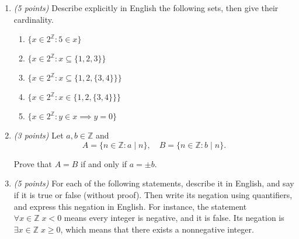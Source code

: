 \documentclass[12pt]{article}
\begin{document}
\begin{enumerate}[itemsep=1.2em]

\item \emph{(5 points)} Describe explicitly in English the following sets, then give their cardinality.

\begin{enumerate}[label=\textbf{\alph*.}, itemsep=1em]
    \item \(\{ x \in 2^{\mathbb{Z}} : 5 \in x \}\) \newline

    \item \(\{ x \in 2^{\mathbb{Z}} : x \subseteq \{ 1, 2, 3 \} \}\)\newline

    \item \(\{ x \in 2^{\mathbb{Z}} : x \subseteq \{ 1, 2, \{ 3, 4 \} \} \}\) \newline

    \item \(\{ x \in 2^{\mathbb{Z}} : x \in \{ 1, 2, \{ 3, 4 \} \} \}\) \newline

    \item \(\{ x \in 2^{\mathbb{Z}} : y \in x \implies y = 0 \}\) \newline

\end{enumerate}

\item \emph{(3 points)} Let \( a, b \in \mathbb{Z} \) and
\[
A = \{ n \in \mathbb{Z} : a \mid n \}, \quad B = \{ n \in \mathbb{Z} : b \mid n \}.
\]

Prove that \( A = B \) if and only if \( a = \pm b \).\newline


\item \emph{(5 points)} For each of the following statements, describe it in English, and say if it is true or false (without proof). Then write its negation using quantifiers, and express this negation in English. For instance, the statement \(\forall x \in \mathbb{Z} \; x < 0\) means every integer is negative, and it is false. Its negation is \(\exists x \in \mathbb{Z} \; x \geq 0\), which means that there exists a nonnegative integer.


\end{enumerate}
\end{document}
